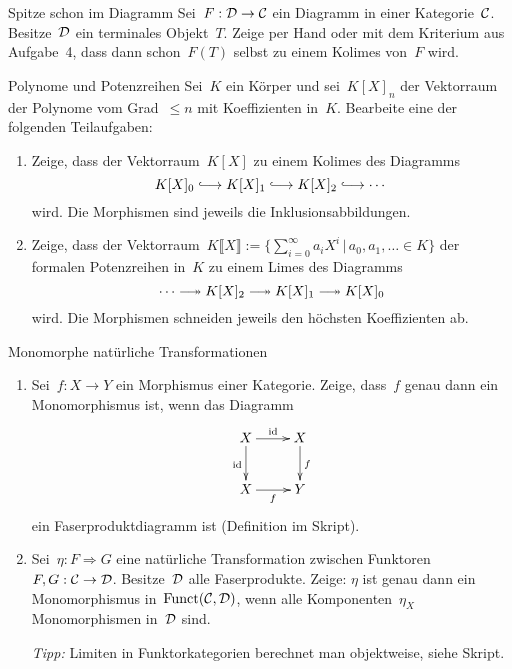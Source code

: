 \documentclass{pizzablatt}
\begin{document}

\setlength{\aufgabenskip}{1.5em}

\begin{aufgabe}{Spitze schon im Diagramm}
Sei~$F:\mathcal{D} \to \mathcal{C}$ ein Diagramm in einer Kategorie~$\mathcal{C}$. Besitze~$\mathcal{D}$ ein
terminales Objekt~$T$.
Zeige per Hand oder mit dem Kriterium aus Aufgabe~4, dass dann
schon~$F(T)$ selbst zu einem Kolimes von~$F$ wird.
\end{aufgabe}

\begin{aufgabe}{Polynome und Potenzreihen}
Sei~$K$ ein Körper und sei~$K[X]_n$ der Vektorraum der Polynome
vom Grad~$\leq n$ mit Koeffizienten in~$K$. Bearbeite eine der folgenden Teilaufgaben:
\begin{enumerate}
\item Zeige, dass der Vektorraum~$K[X]$ zu einem Kolimes des Diagramms
\[ K[X]_0 \lhra K[X]_1 \lhra K[X]_2 \lhra \cdots \]
wird. Die Morphismen sind jeweils die Inklusionsabbildungen.
\item Zeige, dass der Vektorraum~$K\llbracket X \rrbracket := \{
\sum_{i=0}^\infty a_i X^i \,|\,
a_0, a_1, \ldots \in K \}$ der formalen
Potenzreihen in~$K$ zu einem Limes des Diagramms
\[ \cdots \lthra K[X]_2 \lthra K[X]_1 \lthra K[X]_0 \]
wird. Die Morphismen schneiden jeweils den höchsten Koeffizienten ab.
\end{enumerate}
\end{aufgabe}

\begin{aufgabe}{Monomorphe natürliche Transformationen}
\begin{enumerate}
\item Sei~$f:X \to Y$ ein Morphismus einer Kategorie. Zeige, dass~$f$ genau
dann ein Monomorphismus ist, wenn das Diagramm
\[ \xymatrix{
  X \ar[r]^\id \ar[d]_\id & X \ar[d]^f \\
  X \ar[r]_f & Y
} \]
ein Faserproduktdiagramm ist (Definition im Skript).
\item Sei~$\eta : F \Rightarrow G$ eine natürliche Transformation zwischen
Funktoren $F, G : \mathcal{C} \to \mathcal{D}$. Besitze~$\mathcal{D}$ alle Faserprodukte. Zeige: $\eta$
ist genau dann ein Monomorphismus in~$\mathrm{Funct}(\mathcal{C},\mathcal{D})$, wenn alle
Komponenten~$\eta_X$ Monomorphismen in~$\mathcal{D}$ sind.

\emph{Tipp:} Limiten in Funktorkategorien berechnet man objektweise, siehe
Skript.
\end{enumerate}
\end{aufgabe}
\end{document}
